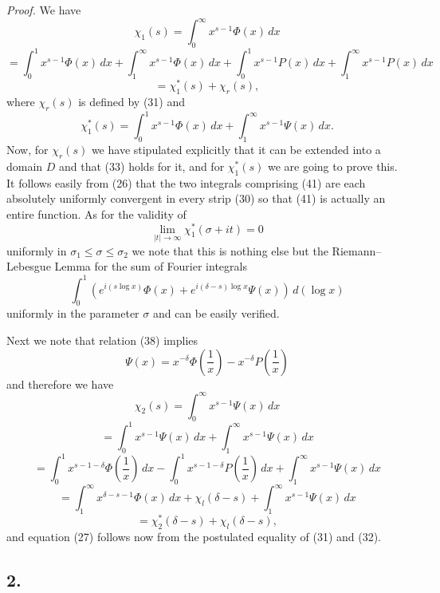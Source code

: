 \documentclass[12pt]{article}
\begin{document}
\noindent\emph{Proof.} We have
\[
\chi_1(s) = \int_0^{\infty} x^{s-1} \Phi(x) \, dx
\]
\[
= \int_0^1 x^{s-1} \Phi(x) \, dx + \int_1^{\infty} x^{s-1} \Phi(x) \, dx + \int_0^1 x^{s-1} P(x) \, dx + \int_1^{\infty} x^{s-1} P(x) \, dx
\]
\[
= \chi_1^*(s) + \chi_r(s),
\]
where \(\chi_r(s)\) is defined by (31) and
\begin{equation}
\chi_1^*(s) = \int_0^1 x^{s-1} \Phi(x) \, dx + \int_1^{\infty} x^{s-1} \Psi(x) \, dx.
\tag{41}
\end{equation}
Now, for \(\chi_r(s)\) we have stipulated explicitly that it can be extended into a domain \(D\) and that (33) holds for it, and for \(\chi_1^*(s)\) we are going to prove this. It follows easily from (26) that the two integrals comprising (41) are each absolutely uniformly convergent in every strip (30) so that (41) is actually an entire function. As for the validity of
\begin{equation}
\lim_{|t| \to \infty} \chi_1^*(\sigma + it) = 0
\tag{42}
\end{equation}
uniformly in \(\sigma_1 \le \sigma \le \sigma_2\) we note that this is nothing else but the Riemann–Lebesgue Lemma for the sum of Fourier integrals
\[
\int_0^1 \left( e^{i(s\log x)} \Phi(x) + e^{i(\delta-s)\log x} \Psi(x) \right) \, d(\log x)
\]
uniformly in the parameter \(\sigma\) and can be easily verified.

Next we note that relation (38) implies
\begin{equation}
\Psi(x) = x^{-\delta} \Phi \left( \frac{1}{x} \right) - x^{-\delta} P \left( \frac{1}{x} \right)
\tag{43}
\end{equation}
and therefore we have
\[
\chi_2(s) = \int_0^{\infty} x^{s-1} \Psi(x) \, dx
\]
\[
= \int_0^1 x^{s-1} \Psi(x) \, dx + \int_1^{\infty} x^{s-1} \Psi(x) \, dx
\]
\[
= \int_0^1 x^{s-1-\delta} \Phi \left( \frac{1}{x} \right) \, dx - \int_0^1 x^{s-1-\delta} P \left( \frac{1}{x} \right) \, dx + \int_1^{\infty} x^{s-1} \Psi(x) \, dx
\]
\[
= \int_1^{\infty} x^{\delta-s-1} \Phi(x) \, dx + \chi_l(\delta - s) + \int_1^{\infty} x^{s-1} \Psi(x) \, dx
\]
\[
= \chi_2^*(\delta - s) + \chi_l(\delta - s),
\]
and equation (27) follows now from the postulated equality of (31) and (32).

\subsection*{2.}
\end{document}

